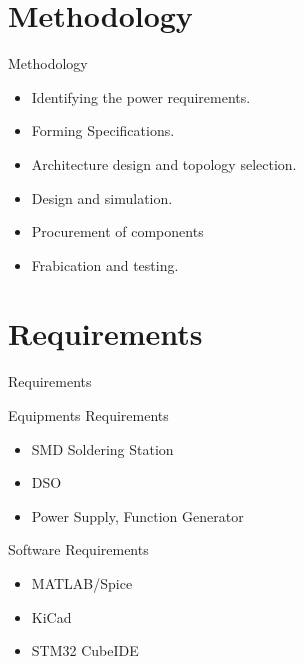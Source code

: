 \documentclass[aspectratio=169]{beamer}
\begin{document}
\section{Methodology}

	
	
	
	

\begin{frame}{Methodology}
		\begin{itemize}
			
			\item Identifying the power requirements.

			\item Forming Specifications.
			\item Architecture design and topology selection.
			\item Design and simulation.
			\item Procurement of components
			\item Frabication and testing.
			
		\end{itemize} 
	
\end{frame}


\section{Requirements}
\begin{frame}{Requirements}
	\begin{minipage}{0.5\textwidth}
		Equipments Requirements
		\begin{itemize}
			
			\item SMD Soldering Station
			\item DSO
			\item Power Supply, Function Generator
		\end{itemize} 
	\end{minipage}
	\begin{minipage}{0.3\textwidth}
		Software Requirements
		\begin{itemize}
			
			\item MATLAB/Spice
			\item KiCad
			\item STM32 CubeIDE
			
		\end{itemize} 
		
	\end{minipage}
\end{frame}
\end{document}
